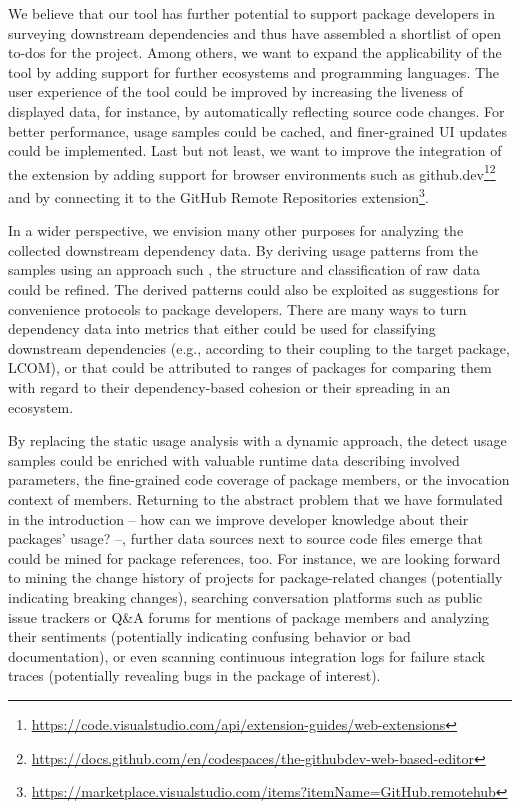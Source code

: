 We believe that our tool has further potential to support package developers in surveying downstream dependencies and thus have assembled a shortlist of open to-dos for the project.
Among others, we want to expand the applicability of the tool by adding support for further ecosystems and programming languages.
The user experience of the tool could be improved by increasing the liveness of displayed data, for instance, by automatically reflecting source code changes.
For better performance, usage samples could be cached, and finer-grained UI updates could be implemented.
Last but not least, we want to improve the integration of the extension by adding support for browser environments such as github.dev\footnote{\url{https://code.visualstudio.com/api/extension-guides/web-extensions}}\footnote{\url{https://docs.github.com/en/codespaces/the-githubdev-web-based-editor}} and by connecting it to the GitHub Remote Repositories extension\footnote{\url{https://marketplace.visualstudio.com/items?itemName=GitHub.remotehub}}.

In a wider perspective, we envision many other purposes for analyzing the collected downstream dependency data.
By deriving usage patterns from the samples using an approach such \cite{zhong2009mapo}, the structure and classification of raw data could be refined.
The derived patterns could also be exploited as suggestions for convenience protocols to package developers.
There are many ways to turn dependency data into metrics that either could be used for classifying downstream dependencies (e.g., according to their coupling to the target package, LCOM), or that could be attributed to ranges of packages for comparing them with regard to their dependency-based cohesion or their spreading in an ecosystem.

By replacing the static usage analysis with a dynamic approach, the detect usage samples could be enriched with valuable runtime data describing involved parameters, the fine-grained code coverage of package members, or the invocation context of members.
Returning to the abstract problem that we have formulated in the introduction -- how can we improve developer knowledge about their packages' usage? --, further data sources next to source code files emerge that could be mined for package references, too.
For instance, we are looking forward to mining the change history of projects for package-related changes (potentially indicating breaking changes), searching conversation platforms such as public issue trackers or Q\&A forums for mentions of package members and analyzing their sentiments (potentially indicating confusing behavior or bad documentation), or even scanning continuous integration logs for failure stack traces (potentially revealing bugs in the package of interest).
